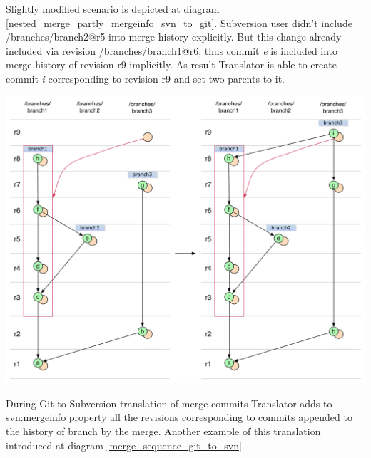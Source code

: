 Slightly modified scenario is depicted at diagram \ref{nested_merge_partly_mergeinfo_svn_to_git}. Subversion user didn't include /branches/branch2@r5 into merge history explicitly. But this change already included via revision /branches/branch1@r6, thus commit \emph{e} is included into merge history of revision r9 implicitly. As result Translator is able to create commit \emph{i} corresponding to revision r9 and set two parents to it.

\begin{center}
\includegraphics[width=\textwidth]{img/diagrams/nested_merge_partly_mergeinfo_svn_to_git.pdf}%
\label{nested_merge_partly_mergeinfo_svn_to_git}%
\end{center}

During Git to Subversion translation of merge commits Translator adds to svn:mergeinfo property all the revisions corresponding to commits appended to the history of branch by the merge. Another example of this translation introduced at diagram \ref{merge_sequence_git_to_svn}.

